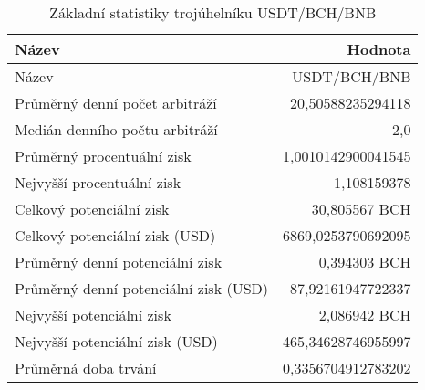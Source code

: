 \begin{table}\centering
\caption{Základní statistiky trojúhelníku USDT/BCH/BNB}
\label{USDTBCHBNB_stats}
\begin{tabular}{|| l | r ||}
\hline Název & Hodnota \\ 
\hline\hline Název & USDT/BCH/BNB \\ 
\hline Průměrný denní počet arbitráží & 20,50588235294118 \\ 
\hline Medián denního počtu arbitráží & 2,0 \\ 
\hline Průměrný procentuální zisk & 1,0010142900041545 \\ 
\hline Nejvyšší procentuální zisk & 1,108159378 \\ 
\hline Celkový potenciální zisk & 30,805567 BCH \\ 
\hline Celkový potenciální zisk (USD) & 6869,0253790692095 \\ 
\hline Průměrný denní potenciální zisk & 0,394303 BCH \\ 
\hline Průměrný denní potenciální zisk (USD) & 87,92161947722337 \\ 
\hline Nejvyšší potenciální zisk & 2,086942 BCH \\ 
\hline Nejvyšší potenciální zisk (USD) & 465,34628746955997 \\ 
\hline Průměrná doba trvání & 0,3356704912783202 \\ 
\hline
\end{tabular}
\end{table}